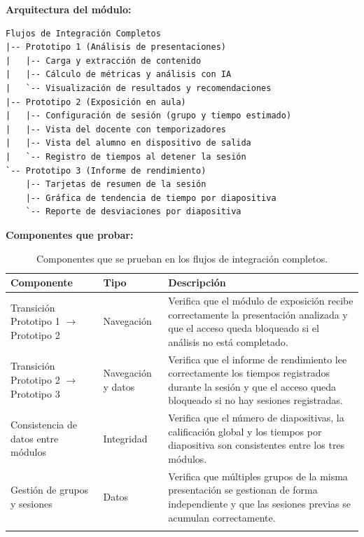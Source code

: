 \documentclass[11pt]{article}
\begin{document}
\textbf{Arquitectura del módulo:}

\begin{verbatim}
Flujos de Integración Completos
|-- Prototipo 1 (Análisis de presentaciones)
|   |-- Carga y extracción de contenido
|   |-- Cálculo de métricas y análisis con IA
|   `-- Visualización de resultados y recomendaciones
|-- Prototipo 2 (Exposición en aula)
|   |-- Configuración de sesión (grupo y tiempo estimado)
|   |-- Vista del docente con temporizadores
|   |-- Vista del alumno en dispositivo de salida
|   `-- Registro de tiempos al detener la sesión
`-- Prototipo 3 (Informe de rendimiento)
    |-- Tarjetas de resumen de la sesión
    |-- Gráfica de tendencia de tiempo por diapositiva
    `-- Reporte de desviaciones por diapositiva
\end{verbatim}

\textbf{Componentes que probar:}
{\tiny
\renewcommand{\arraystretch}{1.2}
\begin{longtable}{|L{4.3cm}|L{2.0cm}|L{8.6cm}|}
\hline
\textbf{Componente} & \textbf{Tipo} & \textbf{Descripción} \\
\hline
\endhead
Transición Prototipo 1 $\rightarrow$ Prototipo 2 & Navegación & Verifica que el módulo de exposición recibe correctamente la presentación analizada y que el acceso queda bloqueado si el análisis no está completado. \\
\hline
Transición Prototipo 2 $\rightarrow$ Prototipo 3 & Navegación y datos & Verifica que el informe de rendimiento lee correctamente los tiempos registrados durante la sesión y que el acceso queda bloqueado si no hay sesiones registradas. \\
\hline
Consistencia de datos entre módulos & Integridad & Verifica que el número de diapositivas, la calificación global y los tiempos por diapositiva son consistentes entre los tres módulos. \\
\hline
Gestión de grupos y sesiones & Datos & Verifica que múltiples grupos de la misma presentación se gestionan de forma independiente y que las sesiones previas se acumulan correctamente. \\
\hline
\caption{Componentes que se prueban en los flujos de integración completos.}
\label{tab:componentes-flujos-integracion-completos}
\end{longtable}
}
\end{document}
